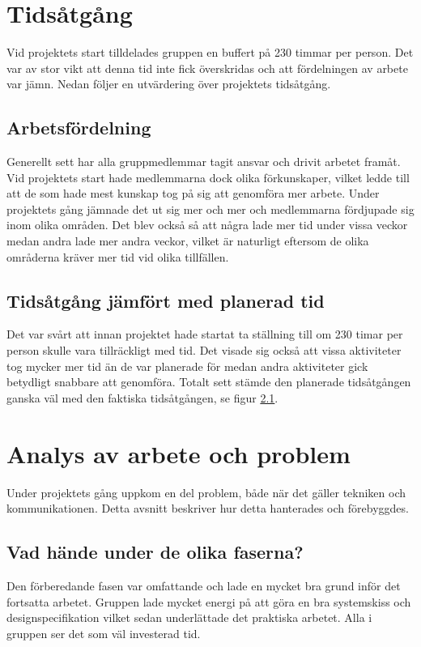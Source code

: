 \documentclass[11pt]{article}
\begin{document}
\pagebreak
{}

\section{Tidsåtgång}
Vid projektets start tilldelades gruppen en buffert på 230 timmar per person. Det var av stor vikt att denna tid inte fick överskridas och att fördelningen av arbete var jämn. Nedan följer en utvärdering över projektets tidsåtgång.

\subsection{Arbetsfördelning}
Generellt sett har alla gruppmedlemmar tagit ansvar och drivit arbetet framåt. Vid projektets start hade medlemmarna dock olika förkunskaper, vilket ledde till att de som hade mest kunskap tog på sig att genomföra mer arbete. Under projektets gång jämnade det ut sig mer och mer och medlemmarna fördjupade sig inom olika områden. Det blev också så att några lade mer tid under vissa veckor medan andra lade mer andra veckor, vilket är naturligt eftersom de olika områderna kräver mer tid vid olika tillfällen.

\subsection{Tidsåtgång jämfört med planerad tid}
Det var svårt att innan projektet hade startat ta ställning till om 230 timar per person skulle vara tillräckligt med tid. Det visade sig också att vissa aktiviteter tog mycker mer tid än de var planerade för medan andra aktiviteter gick betydligt snabbare att genomföra. Totalt sett stämde den planerade tidsåtgången ganska väl med den faktiska tidsåtgången, se figur \ref{}.

\section{Analys av arbete och problem}
Under projektets gång uppkom en del problem, både när det gäller tekniken och kommunikationen. Detta avsnitt beskriver hur detta hanterades och förebyggdes. 

\subsection{Vad hände under de olika faserna?}
Den förberedande fasen var omfattande och lade en mycket bra grund inför det fortsatta arbetet. Gruppen lade mycket energi på att göra en bra systemskiss och designspecifikation vilket sedan underlättade det praktiska arbetet. Alla i gruppen ser det som väl investerad tid.
\end{document}
